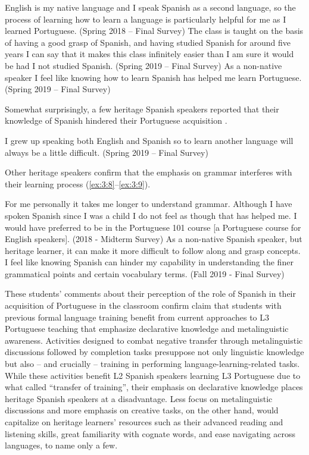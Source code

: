 \documentclass[output=paper]{../langscibook}
\begin{document}
\ea%
    \label{ex:3:4}
    English is my native language and I speak Spanish as a second language, so the process of learning how to learn a language is particularly helpful for me as I learned Portuguese. (Spring 2018 – Final Survey)
\ex%
    \label{ex:3:5}
    The class is taught on the basis of having a good grasp of Spanish, and having studied Spanish for around five years I can say that it makes this class infinitely easier than I am sure it would be had I not studied Spanish. (Spring 2019 – Final Survey)
\ex%
    \label{ex:3:6}
    As a non-native speaker I feel like knowing how to learn Spanish has helped me learn Portuguese. (Spring 2019 – Final Survey)            
\z

Somewhat surprisingly, a few heritage Spanish speakers reported that their knowledge of Spanish hindered their Portuguese acquisition .

\ea%
\label{ex:3:7}
I grew up speaking both English and Spanish so to learn another language will always be a little difficult. (Spring 2019 – Final Survey)
\z

Other heritage speakers confirm that the emphasis on grammar interferes with their learning process (\ref{ex:3:8}--\ref{ex:3:9}).

\ea%
\label{ex:3:8}
For me personally it takes me longer to understand grammar. Although I have spoken Spanish since I was a child I do not feel as though that has helped me. I would have preferred to be in the Portuguese 101 course [a Portuguese course for English speakers]. (2018 - Midterm Survey)
\ex%
\label{ex:3:9}
As a non-native Spanish speaker, but heritage learner, it can make it more difficult to follow along and grasp concepts. I feel like knowing Spanish can hinder my capability in understanding the finer grammatical points and certain vocabulary terms. (Fall 2019 - Final Survey)
\z

These students’ comments about their perception of the role of Spanish in their acquisition of Portuguese in the classroom confirm  claim that students with previous formal language training benefit from current approaches to L3 Portuguese teaching that emphasize declarative knowledge and metalinguistic awareness. Activities designed to combat negative transfer through metalinguistic discussions followed by completion tasks presuppose not only linguistic knowledge but also -- and crucially -- training in performing language-learning-related tasks. While these activities benefit L2 Spanish speakers learning L3 Portuguese due to what \citet[34]{Odlin1989} called “transfer of training”, their emphasis on declarative knowledge places heritage Spanish speakers at a disadvantage. Less focus on metalinguistic discussions and more emphasis on creative tasks, on the other hand, would capitalize on heritage learners’ resources such as their advanced reading and listening skills, great familiarity with cognate words, and ease navigating across languages, to name only a few. 
\end{document}
